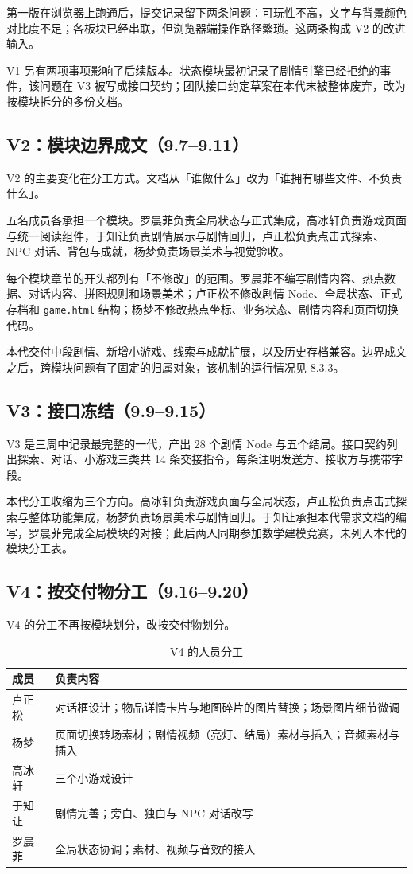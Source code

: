 第一版在浏览器上跑通后，提交记录留下两条问题：可玩性不高，文字与背景颜色对比度不足；各板块已经串联，但浏览器端操作路径繁琐。这两条构成 V2 的改进输入。

V1 另有两项事项影响了后续版本。状态模块最初记录了剧情引擎已经拒绝的事件，该问题在 V3 被写成接口契约；团队接口约定草案在本代末被整体废弃，改为按模块拆分的多份文档。

\subsection{V2：模块边界成文（9.7--9.11）}

V2 的主要变化在分工方式。文档从「谁做什么」改为「谁拥有哪些文件、不负责什么」。

五名成员各承担一个模块。罗晨菲负责全局状态与正式集成，高冰轩负责游戏页面与统一阅读组件，于知让负责剧情展示与剧情回归，卢正松负责点击式探索、NPC 对话、背包与成就，杨梦负责场景美术与视觉验收。

每个模块章节的开头都列有「不修改」的范围。罗晨菲不编写剧情内容、热点数据、对话内容、拼图规则和场景美术；卢正松不修改剧情 Node、全局状态、正式存档和 \texttt{game.html} 结构；杨梦不修改热点坐标、业务状态、剧情内容和页面切换代码。

本代交付中段剧情、新增小游戏、线索与成就扩展，以及历史存档兼容。边界成文之后，跨模块问题有了固定的归属对象，该机制的运行情况见 8.3.3。

\subsection{V3：接口冻结（9.9--9.15）}

V3 是三周中记录最完整的一代，产出 28 个剧情 Node 与五个结局。接口契约列出探索、对话、小游戏三类共 14 条交接指令，每条注明发送方、接收方与携带字段。

本代分工收缩为三个方向。高冰轩负责游戏页面与全局状态，卢正松负责点击式探索与整体功能集成，杨梦负责场景美术与剧情回归。于知让承担本代需求文档的编写，罗晨菲完成全局模块的对接；此后两人同期参加数学建模竞赛，未列入本代的模块分工表。

\subsection{V4：按交付物分工（9.16--9.20）}

V4 的分工不再按模块划分，改按交付物划分。

\begin{table}[htbp]
\centering
\caption{V4 的人员分工}
\small
\begin{tabularx}{\linewidth}{@{}l X@{}}
\toprule
成员 & 负责内容 \\
\midrule
卢正松 & 对话框设计；物品详情卡片与地图碎片的图片替换；场景图片细节微调 \\
杨梦 & 页面切换转场素材；剧情视频（亮灯、结局）素材与插入；音频素材与插入 \\
高冰轩 & 三个小游戏设计 \\
于知让 & 剧情完善；旁白、独白与 NPC 对话改写 \\
罗晨菲 & 全局状态协调；素材、视频与音效的接入 \\
\bottomrule
\end{tabularx}
\end{table}

